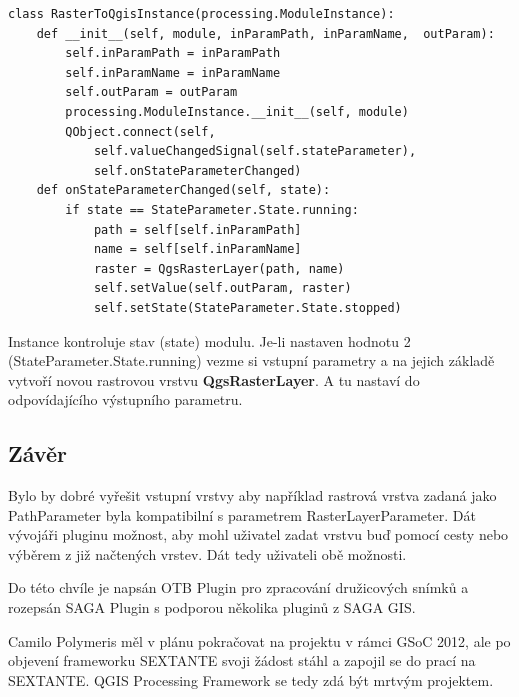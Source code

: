 \begin{lstlisting}[caption={Třída RasterToQgisInstance reprezentující instanci modulu pro QGIS Processing Framework}, label=pf:rasterToQgisInstance, morekeywords={processing.ModuleInstance, RasterToQgisInstance, __init__, valueChangedSignal,onStateParameterChanged, QgsRasterLayer,setValue }]
class RasterToQgisInstance(processing.ModuleInstance):
    def __init__(self, module, inParamPath, inParamName,  outParam):
        self.inParamPath = inParamPath
        self.inParamName = inParamName
        self.outParam = outParam
        processing.ModuleInstance.__init__(self, module)
        QObject.connect(self,
            self.valueChangedSignal(self.stateParameter),
            self.onStateParameterChanged)
    def onStateParameterChanged(self, state):
        if state == StateParameter.State.running:            
            path = self[self.inParamPath]
            name = self[self.inParamName]
            raster = QgsRasterLayer(path, name)
            self.setValue(self.outParam, raster)
            self.setState(StateParameter.State.stopped)
\end{lstlisting}

Instance kontroluje stav (state) modulu. Je-li nastaven hodnotu 2 (StateParameter.State.running) vezme si vstupní parametry a na jejich základě vytvoří novou rastrovou vrstvu \textbf{QgsRasterLayer}. A tu nastaví do odpovídajícího výstupního parametru.


\subsection{Závěr}

Bylo by dobré vyřešit vstupní vrstvy aby například rastrová vrstva zadaná jako PathParameter byla kompatibilní s parametrem RasterLayerParameter. Dát vývojáři pluginu možnost, aby mohl  uživatel zadat vrstvu buď pomocí cesty nebo výběrem z již načtených vrstev. Dát tedy uživateli obě možnosti.

Do této chvíle je napsán OTB Plugin pro zpracování družicových snímků a rozepsán SAGA Plugin s podporou několika pluginů z SAGA GIS.

Camilo Polymeris měl v plánu pokračovat na projektu v rámci GSoC 2012, ale po objevení frameworku SEXTANTE svoji žádost stáhl a zapojil se do prací na SEXTANTE. QGIS Processing Framework se tedy zdá být mrtvým projektem.

